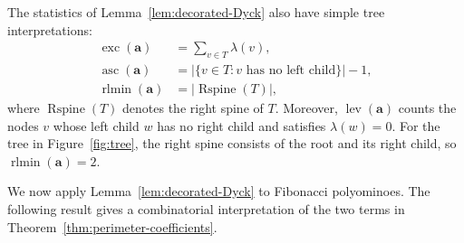 \documentclass[12pt]{amsart}
\theoremstyle{plain}
\theoremstyle{definition}
\begin{document}
The statistics of Lemma~\ref{lem:decorated-Dyck} also have simple tree
interpretations:
\begin{align*}
\operatorname{exc}(\mathbf a)
&=\sum_{v\in T}\lambda(v),\\
\operatorname{asc}(\mathbf a)
&=\bigl|\{v\in T:v\text{ has no left child}\}\bigr|-1,\\
\operatorname{rlmin}(\mathbf a)
&=\bigl|\operatorname{Rspine}(T)\bigr|,
\end{align*}
where $\operatorname{Rspine}(T)$ denotes the right spine of $T$.
Moreover, $\operatorname{lev}(\mathbf a)$ counts the nodes $v$ whose
left child $w$ has no right child and satisfies $\lambda(w)=0$.
For the tree in Figure~\ref{fig:tree}, the right spine consists of the
root and its right child, so $\operatorname{rlmin}(\mathbf a)=2$.




We now apply Lemma~\ref{lem:decorated-Dyck} to Fibonacci polyominoes.
The following result gives a combinatorial interpretation of the two
terms in Theorem~\ref{thm:perimeter-coefficients}.
\end{document}
